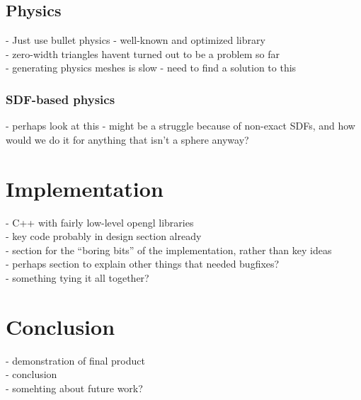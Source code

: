 \documentclass{article}
\begin{document}
 \subsection{Physics}
 - Just use bullet physics - well-known and optimized library\\
 - zero-width triangles havent turned out to be a problem so far\\
 - generating physics meshes is slow - need to find a solution to this\\
 \subsubsection{SDF-based physics}
 - perhaps look at this - might be a struggle because of non-exact SDFs, and how would we do it for anything that isn't a sphere anyway?
 
 \section{Implementation}
  - C++ with fairly low-level opengl libraries\\
  - key code probably in design section already\\
  - section for the ``boring bits'' of the implementation, rather than key ideas\\
  - perhaps section to explain other things that needed bugfixes?\\
  - something tying it all together?
  
\section{Conclusion}
 - demonstration of final product\\
 - conclusion\\
 - somehting about future work?

\end{document}

